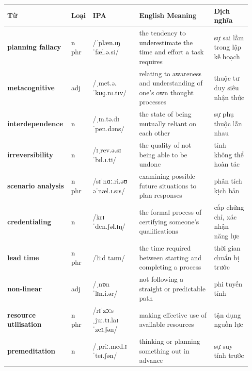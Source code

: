 \separator


\vspace{0.8em}
\begin{center}
\renewcommand{\arraystretch}{1.65}
\begin{tabularx}{\textwidth}{|V{0.22\textwidth}|C{0.07\textwidth}|I{0.20\textwidth}|Y|V{0.18\textwidth}|}
\hline
{}
\textbf{Từ} & \textbf{Loại} & \textbf{IPA} & \textbf{English Meaning} & \textbf{Dịch nghĩa} \\
\hline
\textbf{planning fallacy} & n phr & /ˈplæn.ɪŋ ˈfæl.ə.si/ & the tendency to underestimate the time and effort a task requires & sự sai lầm trong lập kế hoạch \\ \hline
\textbf{metacognitive} & adj & /ˌmet.ə.ˈkɒɡ.nɪ.tɪv/ & relating to awareness and understanding of one's own thought processes & thuộc tư duy siêu nhận thức \\ \hline
\textbf{interdependence} & n & /ˌɪn.tə.dɪˈpen.dəns/ & the state of being mutually reliant on each other & sự phụ thuộc lẫn nhau \\ \hline
\textbf{irreversibility} & n & /ɪˌrev.ə.sɪˈbɪl.ɪ.ti/ & the quality of not being able to be undone & tính không thể hoàn tác \\ \hline
\textbf{scenario analysis} & n phr & /sɪˈnɑː.ri.əʊ əˈnæl.ɪ.sɪs/ & examining possible future situations to plan responses & phân tích kịch bản \\ \hline
\textbf{credentialing} & n & /krɪˈden.ʃəl.ɪŋ/ & the formal process of certifying someone's qualifications & cấp chứng chỉ, xác nhận năng lực \\ \hline
\textbf{lead time} & n phr & /liːd taɪm/ & the time required between starting and completing a process & thời gian chuẩn bị trước \\ \hline
\textbf{non-linear} & adj & /ˌnɒn ˈlɪn.i.ər/ & not following a straight or predictable path & phi tuyến tính \\ \hline
\textbf{resource utilisation} & n phr & /rɪˈzɔːs ˌjuː.tɪ.laɪˈzeɪ.ʃən/ & making effective use of available resources & tận dụng nguồn lực \\ \hline
\textbf{premeditation} & n & /ˌpriː.med.ɪˈteɪ.ʃən/ & thinking or planning something out in advance & sự suy tính trước \\ \hline
\end{tabularx}
\end{center}

\newpage

